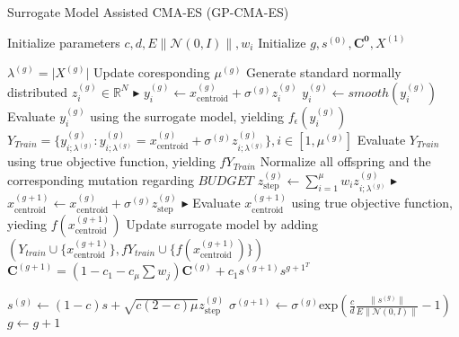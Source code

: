 \documentclass{article}
\begin{document}
\pagebreak
\begin{algorithm}
\caption{Surrogate Model Assisted CMA-ES (GP-CMA-ES)}
\begin{algorithmic}[1]
\STATE Initialize parameters $c,d, E \| \mathcal{N}(0,I) \|,w_i$
\STATE Initialize $g, s^{(0)},\mathbf{C^{0}}, X^{(1)}$

    \STATE $\lambda^{(g)} = \vert X^{(g)}\vert$
    \STATE Update coresponding $\mu^{(g)}$
		\STATE Generate standard normally distributed $z_i^{(g)} \in \mathbb{R}^N $
		\hfill$\blacktriangleright$ %
		\STATE $y_i^{(g)} \leftarrow x_{\text{centroid}}^{(g)} + \sigma^{(g)} z_i^{(g)}$ 
		\STATE $y_i^{(g)} \leftarrow smooth(y_i^{(g)}) $ 
		\hfill{} %
		\STATE Evaluate $y_i^{(g)}$ using the surrogate model, yielding $f_\epsilon (y_i^{(g)})$
	\ENDFOR
	\STATE $Y_{Train} = \{y_{i;\lambda^{(g)}}^{(g)}:y_{i;\lambda^{(g)}}^{(g)} = x_{\text{centroid}}^{(g)} + \sigma^{(g)} z_{i;\lambda^{(g)}}^{(g)}  \},i \in [1,\mu^{(g)}]$
	\hfill{} %
    \STATE Evaluate $Y_{Train}$ using true objective function, yielding $fY_{Train}$
    \STATE Normalize all offspring and the corresponding mutation regarding $BUDGET$
	\STATE $z_{\text{step}}^{(g)} \leftarrow \sum_{i=1}^{\mu} w_i z_{i;\lambda^{(g)}}^{(g)}$
	\hfill$\blacktriangleright$ %
	\STATE $x_{\text{centroid}}^{(g+1)} \leftarrow  x_{\text{centroid}}^{(g)} + \sigma^{(g)} z_{\text{step}}^{(g)}$ 
	\hfill$\blacktriangleright$ %
	\STATE Evaluate $x_{\text{centroid}}^{(g+1)}$ using true objective function, yieding $f(x_{\text{centroid}}^{(g+1)})$
	\STATE Update surrogate model by adding $( Y_{train} \cup  \{ x_{\text{centroid}}^{(g+1)} \}, fY_{train} \cup  \{ f(x_{\text{centroid}}^{(g+1)}) \} )$
	\STATE $\mathbf{C}^{(g+1)} = (1-c_1-c_\mu \sum w_j)\mathbf{C}^{(g)} + c_1 s^{(g+1)}s^{g+1}^T$
	
	\STATE $s^{(g)} \leftarrow (1-c)s + \sqrt{ c(2-c) \mu} z_{\text{step}}^{(g)}$
	\STATE $\sigma^{(g+1)} \leftarrow \sigma^{(g)}  \text{exp} \left(\frac{c}{d} \frac{\| s^{(g)} \|} { E \| \mathcal{N}(0,I) \|} -1 \right )$
	\STATE $g \leftarrow g + 1$
\ENDWHILE

\end{algorithmic}
\end{algorithm}
\end{document}
